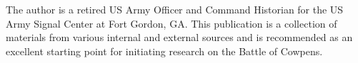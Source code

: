 The author is a retired US Army Officer and Command Historian for the US Army
Signal Center at Fort Gordon, GA.  This publication is a collection of
materials from various internal and external sources and is recommended as an
excellent starting point for initiating research on the Battle of Cowpens.
